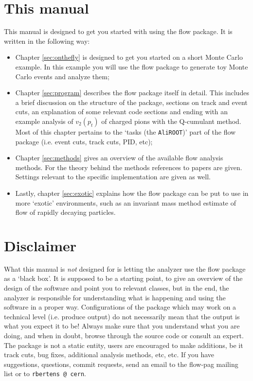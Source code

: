 \documentclass[a4paper]{book}
\numberwithin{equation}{subsection}
\begin{document}
\section{This manual}
This manual is designed to get you started with using the flow package. It is written in the following way:
\begin{itemize}
    \item Chapter \ref{sec:onthefly} is designed to get you started on a short Monte Carlo example. In this example you will use the flow package to generate toy Monte Carlo events and analyze them;
    \item Chapter \ref{sec:program} describes the flow package itself in detail. This includes a brief discussion on the structure of the package, sections on track and event cuts, an explanation of some relevant code sections and ending with an example analysis of $v_2(p_t)$ of charged pions with the Q-cumulant method. Most of this chapter pertains to the `tasks (the \texttt{AliROOT})' part of the flow package (i.e. event cuts, track cuts, PID, etc);
    \item Chapter \ref{sec:methods} gives an overview of the available flow analysis methods. For the theory behind the methods references to papers are given. Settings relevant to the specific implementation are given as well. 
    \item Lastly, chapter \ref{sec:exotic} explains how the flow package can be put to use in more `exotic' environments, such as an invariant mass method estimate of flow of rapidly decaying particles. 
    \end{itemize}
\section{Disclaimer}
What this manual is \emph{not} designed for is letting the analyzer use the flow package as a `black box'. It is supposed to be a starting point, to give an overview of the design of the software and point you to relevant classes, but in the end, the analyzer is responsible for understanding what is happening and using the software in a proper way. Configurations of the package which may work on a technical level (i.e. produce output) do not necessarily mean that the output is what you expect it to be! Always make sure that you understand what you are doing, and when in doubt, browse through the source code or consult an expert. The package is not a static entity, users are encouraged to make additions, be it track cuts, bug fixes, additional analysis methods, etc, etc. If you have suggestions, questions, commit requests, send an email to the flow-pag mailing list or to \texttt{rbertens @ cern}. 
\end{document}
